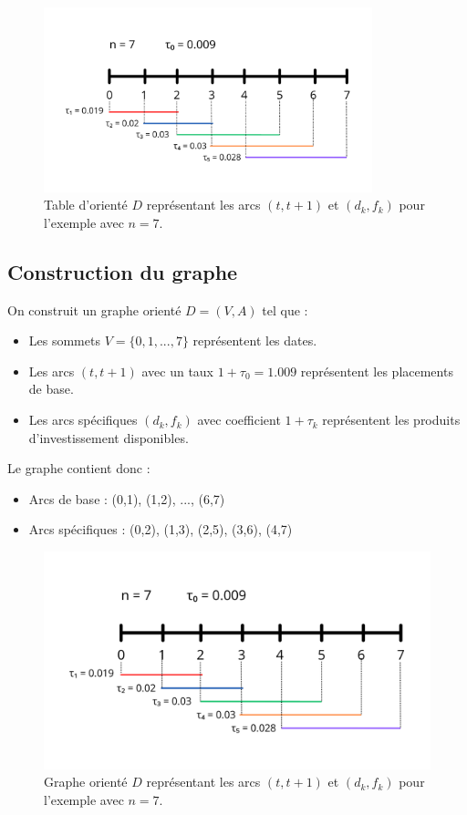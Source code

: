 \documentclass[a4paper,11pt]{article}
\begin{document}
    \begin{figure}[h!]
        \centering
        \includegraphics[width=0.85\textwidth]{images/table.png}
        \caption{Table d'orienté $D$ représentant les arcs $(t, t+1)$ et $(d_k, f_k)$ pour l'exemple avec $n = 7$.}
        \label{fig:table_exemple}
    \end{figure}

    \subsection{Construction du graphe}

    On construit un graphe orienté $D = (V, A)$ tel que :
    \begin{itemize}
        \item Les sommets $V = \{0, 1, ..., 7\}$ représentent les dates.
        \item Les arcs $(t, t+1)$ avec un taux $1 + \tau_0 = 1.009$ représentent les placements de base.
        \item Les arcs spécifiques $(d_k, f_k)$ avec coefficient $1 + \tau_k$ représentent les produits d’investissement disponibles.
    \end{itemize}

    Le graphe contient donc :
    \begin{itemize}
        \item Arcs de base : (0,1), (1,2), ..., (6,7)
        \item Arcs spécifiques : (0,2), (1,3), (2,5), (3,6), (4,7)
    \end{itemize}

    \begin{figure}[h!]
        \centering
        \includegraphics[width=1\textwidth]{images/graph_concret_exemple.png}
        \caption{Graphe orienté $D$ représentant les arcs $(t, t+1)$ et $(d_k, f_k)$ pour l'exemple avec $n = 7$.}
        \label{fig:graphe_exemple}
    \end{figure}
    \newpage
\end{document}
